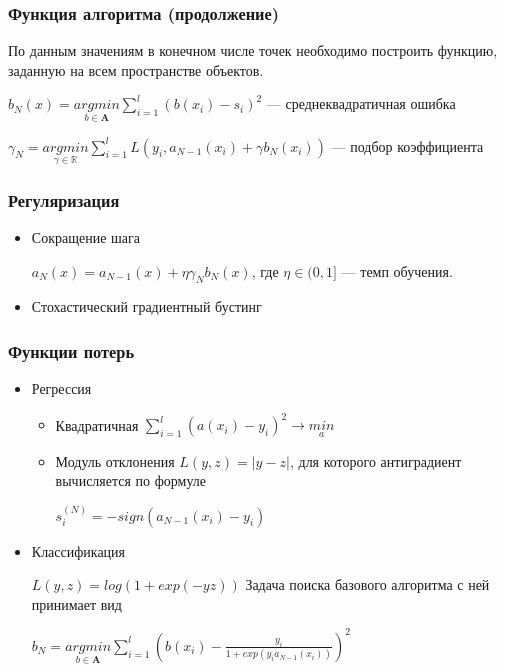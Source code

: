 \documentclass[fleqn,pdf, 9pt, usenames, dvipsnames, unicode, hyperref={bookmarks=true,bookmarksopen=false, bookmarksnumbered}]{beamer}
\begin{document}

\begin{frame}\frametitle{Функция алгоритма (продолжение)}

По данным значениям в конечном числе точек необходимо построить функцию, заданную на всем пространстве объектов.

$b_N(x) = \underset{b\in\mathbf{A}}{argmin}\sum_{i=1}^{l} (b(x_i) - s_i)^2$ --- среднеквадратичная ошибка

$\gamma_N = \underset{\gamma\in\mathbf{\mathbb{R}}}{argmin}\sum_{i=1}^{l} L(y_i,a_{N-1}(x_i) + \gamma b_N(x_i))$ --- подбор коэффициента

\end{frame}


\begin{frame}\frametitle{Регуляризация}

\begin{itemize}
    \item Сокращение шага
    
    $a_N(x) = a_{N-1}(x) + \eta\gamma_Nb_N(x)$, где $\eta \in (0,1]$ --- темп обучения.
    \item Стохастический градиентный бустинг
    
    
    
\end{itemize}

\end{frame}


\begin{frame}\frametitle{Функции потерь}

\begin{itemize}
    \item Регрессия
    
    \begin{itemize}
        \item Квадратичная $\sum_{i=1}^{l}(a(x_i)-y_i)^2 \rightarrow \underset{a}{min}$
        \item Модуль отклонения $L(y,z) = |y-z|$, для которого антиградиент вычисляется по формуле 

        $s_i^{(N)} = -sign(a_{N-1}(x_i)-y_i)$
    \end{itemize}
    
    \item Классификация
    
    $L(y,z) = log(1+exp(-yz))$
\newline
    Задача поиска базового алгоритма с ней принимает вид

    $b_N = \underset{b\in\mathbf{A}}{argmin}\sum_{i=1}^{l} (b(x_i) - \frac{y_i}{1+exp(y_ia_{N-1}(x_i))})^2$
\end{itemize}


\end{frame}
\end{document}
